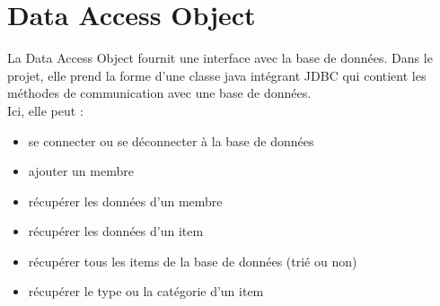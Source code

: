 \section{Data Access Object}

La Data Access Object fournit une interface avec la base de données. Dans le 
projet, elle prend la forme d'une classe java intégrant JDBC qui contient les 
méthodes de communication avec une base de données. \\

Ici, elle peut :

\begin{itemize}
	\item se connecter ou se déconnecter à la base de données
	\item ajouter un membre
	\item récupérer les données d'un membre
	\item récupérer les données d'un item
	\item récupérer tous les items de la base de données (trié ou non)
	\item récupérer le type ou la catégorie d'un item
\end{itemize}
